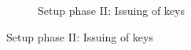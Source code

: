 \begin{figure}
\begin{subfigure}[t]{0.45\textwidth}
\begin{tikzpicture}[actor/.style={draw, minimum width=1.5cm}]

        \end{tikzpicture}
        \caption{Setup phase II: Issuing of keys}
    \end{subfigure}
\end{figure}